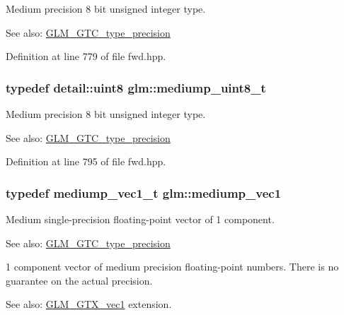 Medium precision 8 bit unsigned integer type. \begin{Desc}
\item[See also:]\hyperlink{group__gtc__type__precision}{GLM\_\-GTC\_\-type\_\-precision} \end{Desc}


Definition at line 779 of file fwd.hpp.\hypertarget{group__gtc__type__precision_gdfa38f3c245d371c4b2079f1fd68928b}{
\subsubsection[mediump\_\-uint8\_\-t]{\setlength{\rightskip}{0pt plus 5cm}typedef detail::uint8 {\bf glm::mediump\_\-uint8\_\-t}}}
\label{group__gtc__type__precision_gdfa38f3c245d371c4b2079f1fd68928b}


Medium precision 8 bit unsigned integer type. \begin{Desc}
\item[See also:]\hyperlink{group__gtc__type__precision}{GLM\_\-GTC\_\-type\_\-precision} \end{Desc}


Definition at line 795 of file fwd.hpp.\hypertarget{group__gtc__type__precision_g1b734d715033ab3026b2fb27e1fb7d3e}{
\subsubsection[mediump\_\-vec1]{\setlength{\rightskip}{0pt plus 5cm}typedef mediump\_\-vec1\_\-t {\bf glm::mediump\_\-vec1}}}
\label{group__gtc__type__precision_g1b734d715033ab3026b2fb27e1fb7d3e}


Medium single-precision floating-point vector of 1 component. \begin{Desc}
\item[See also:]\hyperlink{group__gtc__type__precision}{GLM\_\-GTC\_\-type\_\-precision}\end{Desc}
1 component vector of medium precision floating-point numbers. There is no guarantee on the actual precision. \begin{Desc}
\item[See also:]\hyperlink{group__gtx__vec1}{GLM\_\-GTX\_\-vec1} extension. \end{Desc}


